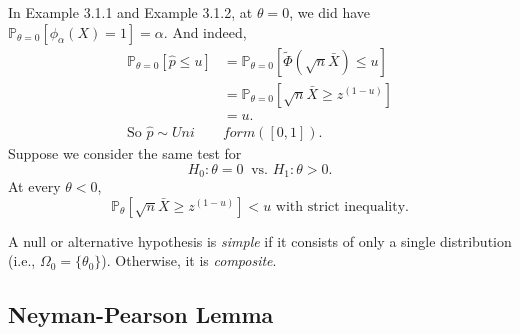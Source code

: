 \documentclass[a4paper]{article}
\begin{document}
\begin{eg}
	In Example 3.1.1 and Example 3.1.2, at $\theta = 0$, we did have $\mathbb{P}_{\theta = 0}[\phi_{\alpha}(X) = 1] = \alpha$. And indeed,
	\begin{equation}
		\begin{aligned}
			\mathbb{P}_{\theta = 0}[\hat{p} \leq u] &= \mathbb{P}_{\theta = 0}[\tilde{\Phi}(\sqrt{n}\bar{X}) \leq u] \\
			&= \mathbb{P}_{\theta = 0}[\sqrt{n}\bar{X} \geq z^{(1-u)}] \\
			&= u. \\
			\text{So } \hat{p} \sim Uni&form ([0,1]).
		\end{aligned}
	\end{equation}
	Suppose we consider the same test for
	\begin{equation*}
		H_0: \theta = 0 \ \text{ vs. } H_1: \theta > 0.
	\end{equation*}
	At every $\theta < 0$,
	\begin{equation}
		\mathbb{P}_{\theta}[\sqrt{n}\bar{X} \geq z^{(1-u)}] < u \text{ with strict inequality.}
	\end{equation}
\end{eg}

\begin{defi}
	A null or alternative hypothesis is \emph{simple} if it consists of only a single distribution (i.e., $\Omega_0 = \{\theta_0\}$). Otherwise, it is \emph{composite}.
\end{defi}

\subsection{Neyman-Pearson Lemma}
\end{document}
